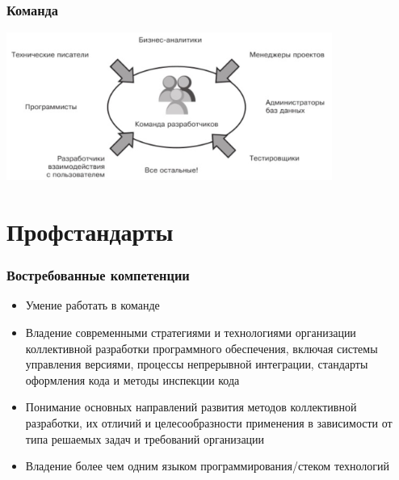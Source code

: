 \documentclass{../../slides-style}
\begin{document}
    \begin{frame}
        \frametitle{Команда}
        \begin{center}
            \includegraphics[width=0.8\textwidth]{team.png}
        \end{center}
    \end{frame}

    \section{Профстандарты}

    \begin{frame}
        \frametitle{Востребованные компетенции}
        \begin{itemize}
            \item Умение работать в команде
            \item Владение современными стратегиями и технологиями организации коллективной разработки программного обеспечения, включая системы управления версиями, процессы непрерывной интеграции, стандарты оформления кода и методы инспекции кода
            \item Понимание основных направлений развития методов коллективной разработки, их отличий и целесообразности применения в зависимости от типа решаемых задач и требований организации
            \item Владение более чем одним языком программирования/стеком технологий
        \end{itemize}
    \end{frame}
\end{document}
